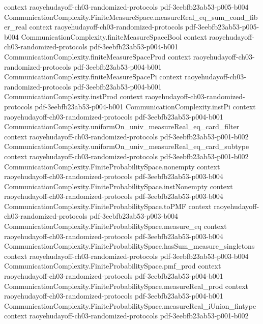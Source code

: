 \begin{theorem}
  {context}
  {raoyehudayoff-ch03-randomized-protocols}
  {pdf-3eebfb23ab53-p005-b004}
\proofstep
  {CommunicationComplexity.FiniteMeasureSpace.measureReal_eq_sum_cond_fiber_real}
  {context}
  {raoyehudayoff-ch03-randomized-protocols}
  {pdf-3eebfb23ab53-p005-b004}
\proofstep
  {CommunicationComplexity.finiteMeasureSpaceBool}
  {context}
  {raoyehudayoff-ch03-randomized-protocols}
  {pdf-3eebfb23ab53-p004-b001}
\proofstep
  {CommunicationComplexity.finiteMeasureSpaceProd}
  {context}
  {raoyehudayoff-ch03-randomized-protocols}
  {pdf-3eebfb23ab53-p004-b001}
\proofstep
  {CommunicationComplexity.finiteMeasureSpacePi}
  {context}
  {raoyehudayoff-ch03-randomized-protocols}
  {pdf-3eebfb23ab53-p004-b001}
\proofstep
  {CommunicationComplexity.instProd}
  {context}
  {raoyehudayoff-ch03-randomized-protocols}
  {pdf-3eebfb23ab53-p004-b001}
\proofstep
  {CommunicationComplexity.instPi}
  {context}
  {raoyehudayoff-ch03-randomized-protocols}
  {pdf-3eebfb23ab53-p004-b001}
\proofstep
  {CommunicationComplexity.uniformOn_univ_measureReal_eq_card_filter}
  {context}
  {raoyehudayoff-ch03-randomized-protocols}
  {pdf-3eebfb23ab53-p001-b002}
\proofstep
  {CommunicationComplexity.uniformOn_univ_measureReal_eq_card_subtype}
  {context}
  {raoyehudayoff-ch03-randomized-protocols}
  {pdf-3eebfb23ab53-p001-b002}
\proofstep
  {CommunicationComplexity.FiniteProbabilitySpace.nonempty}
  {context}
  {raoyehudayoff-ch03-randomized-protocols}
  {pdf-3eebfb23ab53-p003-b004}
\proofstep
  {CommunicationComplexity.FiniteProbabilitySpace.instNonempty}
  {context}
  {raoyehudayoff-ch03-randomized-protocols}
  {pdf-3eebfb23ab53-p003-b004}
\proofstep
  {CommunicationComplexity.FiniteProbabilitySpace.toPMF}
  {context}
  {raoyehudayoff-ch03-randomized-protocols}
  {pdf-3eebfb23ab53-p003-b004}
\proofstep
  {CommunicationComplexity.FiniteProbabilitySpace.measure_eq}
  {context}
  {raoyehudayoff-ch03-randomized-protocols}
  {pdf-3eebfb23ab53-p003-b004}
\proofstep
  {CommunicationComplexity.FiniteProbabilitySpace.hasSum_measure_singletons}
  {context}
  {raoyehudayoff-ch03-randomized-protocols}
  {pdf-3eebfb23ab53-p003-b004}
\proofstep
  {CommunicationComplexity.FiniteProbabilitySpace.pmf_prod}
  {context}
  {raoyehudayoff-ch03-randomized-protocols}
  {pdf-3eebfb23ab53-p004-b001}
\proofstep
  {CommunicationComplexity.FiniteProbabilitySpace.measureReal_prod}
  {context}
  {raoyehudayoff-ch03-randomized-protocols}
  {pdf-3eebfb23ab53-p004-b001}
\proofstep
  {CommunicationComplexity.FiniteProbabilitySpace.measureReal_iUnion_fintype}
  {context}
  {raoyehudayoff-ch03-randomized-protocols}
  {pdf-3eebfb23ab53-p001-b002}

\end{theorem}
